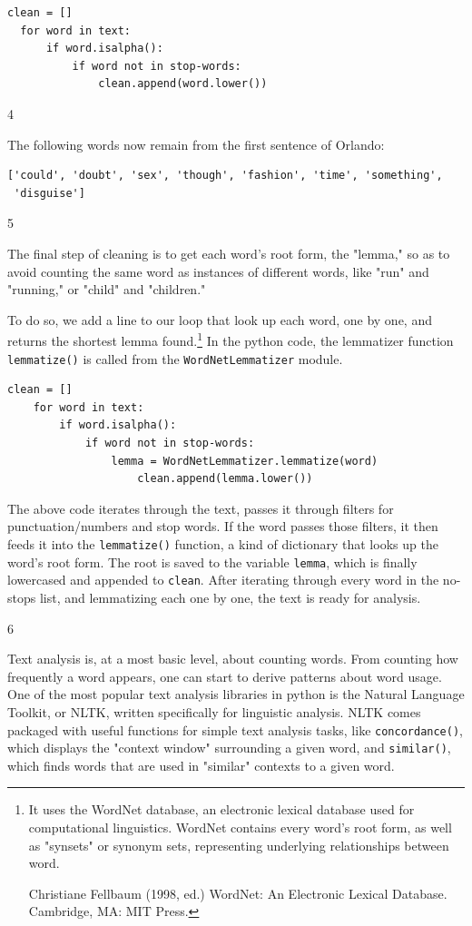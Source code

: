 \documentclass[11pt]{article}
\begin{document}
\begin{verbatim}
clean = [] 
  for word in text:
      if word.isalpha():
          if word not in stop-words:
              clean.append(word.lower())
\end{verbatim}

4

The following words now remain from the first sentence of Orlando:

\begin{verbatim}
['could', 'doubt', 'sex', 'though', 'fashion', 'time', 'something',
 'disguise']
\end{verbatim}

5

The final step of cleaning is to get each word's root form, the
"lemma," so as to avoid counting the same word as instances of
different words, like "run" and "running," or "child" and "children."

To do so, we add a line to our loop that look up each word, one by
one, and returns the shortest lemma found.\footnote{It uses the WordNet database, an electronic lexical database
used for computational linguistics. WordNet contains every word's root
form, as well as "synsets" or synonym sets, representing underlying
relationships between word.

Christiane Fellbaum (1998, ed.) WordNet: An Electronic Lexical
Database. Cambridge, MA: MIT Press.} In the python code,
the lemmatizer function \texttt{lemmatize()} is called from the
\texttt{WordNetLemmatizer} module.

\begin{verbatim}
clean = [] 
    for word in text:
        if word.isalpha():
            if word not in stop-words:
                lemma = WordNetLemmatizer.lemmatize(word)
                    clean.append(lemma.lower())
\end{verbatim}

The above code iterates through the text, passes it through filters
for punctuation/numbers and stop words. If the word passes those
filters, it then feeds it into the \texttt{lemmatize()} function, a kind of
dictionary that looks up the word's root form. The root is saved to
the variable \texttt{lemma}, which is finally lowercased and appended to
\texttt{clean}. After iterating through every word in the no-stops list, and
lemmatizing each one by one, the text is ready for analysis.

6

Text analysis is, at a most basic level, about counting words. From
counting how frequently a word appears, one can start to derive
patterns about word usage. One of the most popular text analysis
libraries in python is the Natural Language Toolkit, or NLTK, written
specifically for linguistic analysis. NLTK comes packaged with useful
functions for simple text analysis tasks, like \texttt{concordance()}, which
displays the "context window" surrounding a given word, and
\texttt{similar()}, which finds words that are used in "similar" contexts to
a given word.
\end{document}
